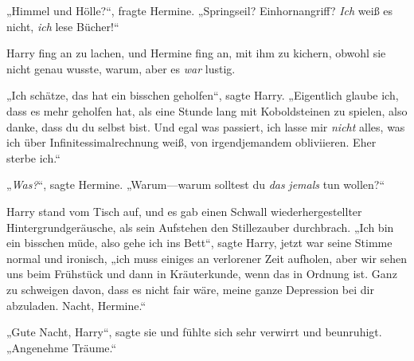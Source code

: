 „Himmel und Hölle?“, fragte Hermine. „Springseil? Einhornangriff? \emph{Ich} weiß es nicht, \emph{ich} lese Bücher!“

Harry fing an zu lachen, und Hermine fing an, mit ihm zu kichern, obwohl sie nicht genau wusste, warum, aber es \emph{war} lustig.

„Ich schätze, das hat ein bisschen geholfen“, sagte Harry. „Eigentlich glaube ich, dass es mehr geholfen hat, als eine Stunde lang mit Koboldsteinen zu spielen, also danke, dass du du selbst bist. Und egal was passiert, ich lasse mir \emph{nicht} alles, was ich über Infinitessimalrechnung weiß, von irgendjemandem obliviieren. Eher sterbe ich.“

„\emph{Was?}“, sagte Hermine. „Warum—warum solltest du \emph{das} \emph{jemals} tun wollen?“

Harry stand vom Tisch auf, und es gab einen Schwall wiederhergestellter Hintergrundgeräusche, als sein Aufstehen den Stillezauber durchbrach. „Ich bin ein bisschen müde, also gehe ich ins Bett“, sagte Harry, jetzt war seine Stimme normal und ironisch, „ich muss einiges an verlorener Zeit aufholen, aber wir sehen uns beim Frühstück und dann in Kräuterkunde, wenn das in Ordnung ist. Ganz zu schweigen davon, dass es nicht fair wäre, meine ganze Depression bei dir abzuladen. Nacht, Hermine.“

„Gute Nacht, Harry“, sagte sie und fühlte sich sehr verwirrt und beunruhigt. „Angenehme Träume.“

